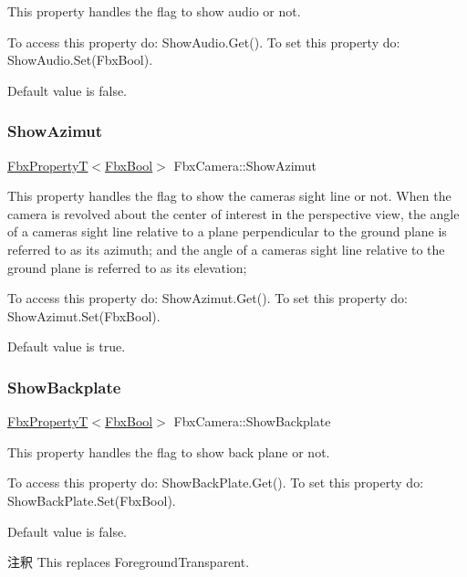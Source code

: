 This property handles the flag to show audio or not.

To access this property do\+: Show\+Audio.\+Get(). To set this property do\+: Show\+Audio.\+Set(\+Fbx\+Bool).

Default value is false. \mbox{\label{class_fbx_camera_a7f2e404049521f2b8ed8793bb231d9a0}} 
\subsubsection{\texorpdfstring{Show\+Azimut}{ShowAzimut}}
{\footnotesize\ttfamily \hyperlink{class_fbx_property_t}{Fbx\+PropertyT}$<$\hyperlink{fbxtypes_8h_a92e0562b2fe33e76a242f498b362262e}{Fbx\+Bool}$>$ Fbx\+Camera\+::\+Show\+Azimut}

This property handles the flag to show the camera\textquotesingle{}s sight line or not. When the camera is revolved about the center of interest in the perspective view, the angle of a camera\textquotesingle{}s sight line relative to a plane perpendicular to the ground plane is referred to as its azimuth; and the angle of a camera\textquotesingle{}s sight line relative to the ground plane is referred to as its elevation;

To access this property do\+: Show\+Azimut.\+Get(). To set this property do\+: Show\+Azimut.\+Set(\+Fbx\+Bool).

Default value is true. \mbox{\label{class_fbx_camera_a3e824d5e68ecd7ff571c3d783b3a82b3}} 
\subsubsection{\texorpdfstring{Show\+Backplate}{ShowBackplate}}
{\footnotesize\ttfamily \hyperlink{class_fbx_property_t}{Fbx\+PropertyT}$<$\hyperlink{fbxtypes_8h_a92e0562b2fe33e76a242f498b362262e}{Fbx\+Bool}$>$ Fbx\+Camera\+::\+Show\+Backplate}

This property handles the flag to show back plane or not.

To access this property do\+: Show\+Back\+Plate.\+Get(). To set this property do\+: Show\+Back\+Plate.\+Set(\+Fbx\+Bool).

Default value is false. \begin{DoxyRemark}{注釈}
This replaces Foreground\+Transparent. 
\end{DoxyRemark}
\mbox{\label{class_fbx_camera_adcb25c847c2d7d471c836722ce1289ff}} 
